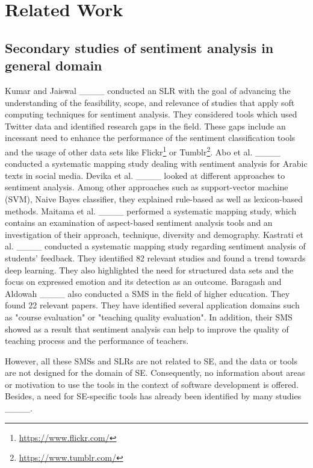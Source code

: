 \section{Related Work}
\label{sec:related}

\subsection{Secondary studies of sentiment analysis in general domain}
Kumar and Jaiswal ____ conducted an SLR with the goal of advancing the understanding of the feasibility, scope, and relevance of studies that apply soft computing techniques for sentiment analysis. They considered tools which used Twitter data and identified research gaps in the field. These gaps include an incessant need to enhance the performance of the sentiment classification tools and the usage of other data sets like Flickr\footnote{\url{https://www.flickr.com/}} or Tumblr\footnote{\url{https://www.tumblr.com/}}.
Abo et al. ____ conducted a systematic mapping study dealing with sentiment analysis for Arabic texts in social media. Devika et al. ____ looked at different approaches to sentiment analysis. Among other approaches such as support-vector machine (SVM), Naive Bayes classifier, they explained rule-based as well as lexicon-based methods.
Maitama et al. ____ performed a systematic mapping study, which contains an examination of aspect-based sentiment analysis tools and an investigation of their approach, technique, diversity and demography.
Kastrati et al. ____ conducted a systematic mapping study regarding sentiment analysis of students' feedback. They identified 82 relevant studies and found a trend towards deep learning. They also highlighted the need for structured data sets and the focus on expressed emotion and its detection as an outcome.
Baragash and Aldowah ____ also conducted a SMS in the field of higher education. They found 22 relevant papers. They have identified several application domains such as "course evaluation" or "teaching quality evaluation". In addition, their SMS showed as a result that sentiment analysis can help to improve the quality of teaching process and the performance of teachers.

However, all these SMSs and SLRs are not related to SE, and the data or tools are not designed for the domain of SE. Consequently, no information about areas or motivation to use the tools in the context of software development is offered. Besides, a need for SE-specific tools has already been identified by many studies ____.

